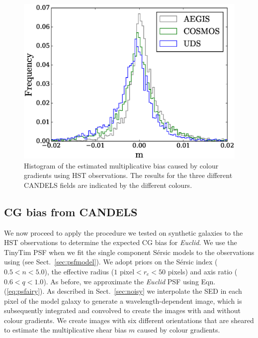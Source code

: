\documentclass[useAMS,usenatbib]{mnras}
\begin{document}
%
\begin{figure}
  \includegraphics[width=\hsize]{zhiscgb.eps}
\caption{Histogram of the estimated multiplicative bias caused by colour gradients using HST
observations. The results for the three different CANDELS fields are indicated by the different
colours.}
\label{fig:cgbhis}
\end{figure}

\subsection{CG bias from CANDELS}

We now proceed to apply the procedure we tested on synthetic galaxies to the HST observations to determine the expected CG bias for {\it Euclid}. We use the {\sc TinyTim} PSF when we fit the single component S{\'e}rsic models
to the observations using {} (see Sect.~\ref{sec:psfmodel}).
We adopt priors on the S{\'e}rsic index ($0.5<n<5.0$), the effective radius ($1$ pixel$<r_e<50$ pixels) and axis ratio ($0.6<q<1.0$). As before, we approximate the {\it Euclid} PSF using Eqn.\,(\ref{eq:psfairy}).  As described in Sect.~\ref{sec:noisy} we interpolate the SED in each pixel of the model galaxy to generate a wavelength-dependent image, which is subsequently integrated and convolved to  create the images with and without colour gradients. We create images with six different orientations that are sheared to estimate the multiplicative shear bias $m$ caused by colour gradients.
\end{document}

